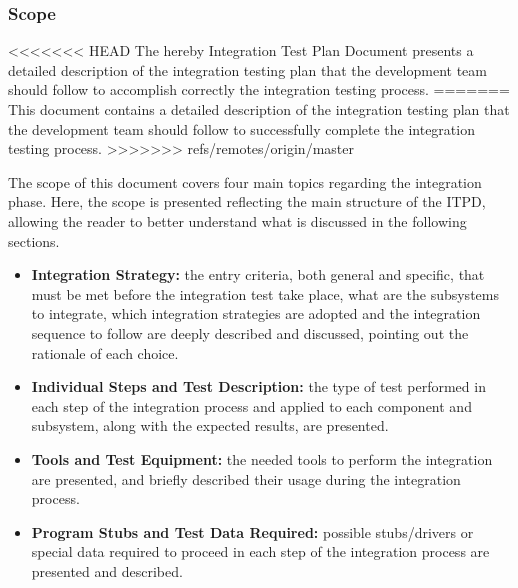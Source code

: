 \subsubsection{Scope}

<<<<<<< HEAD
The hereby Integration Test Plan Document presents a detailed description of the integration testing plan that the development team should follow to accomplish correctly the integration testing process.
=======
This document contains a detailed description of the integration testing plan that the development team should follow to successfully complete the integration testing process.
>>>>>>> refs/remotes/origin/master

The scope of this document covers four main topics regarding the integration phase. Here, the scope is presented reflecting the main structure of the ITPD, allowing the reader to better understand what is discussed in the following sections.

\begin{itemize}
	\item \textbf{Integration Strategy:} the entry criteria, both general and specific, that must be met before the integration test take place, what are the subsystems to integrate, which integration strategies are adopted and the integration sequence to follow are deeply described and discussed, pointing out the rationale of each choice.
	\item \textbf{Individual Steps and Test Description:} the type of test performed in each step of the integration process and applied to each component and subsystem, along with the expected results, are presented.
	\item \textbf{Tools and Test Equipment:} the needed tools to perform the integration are presented, and briefly described their usage during the integration process.
	\item \textbf{Program Stubs and Test Data Required:} possible stubs/drivers or special data required to proceed in each step of the integration process are presented and described. 
\end{itemize}
